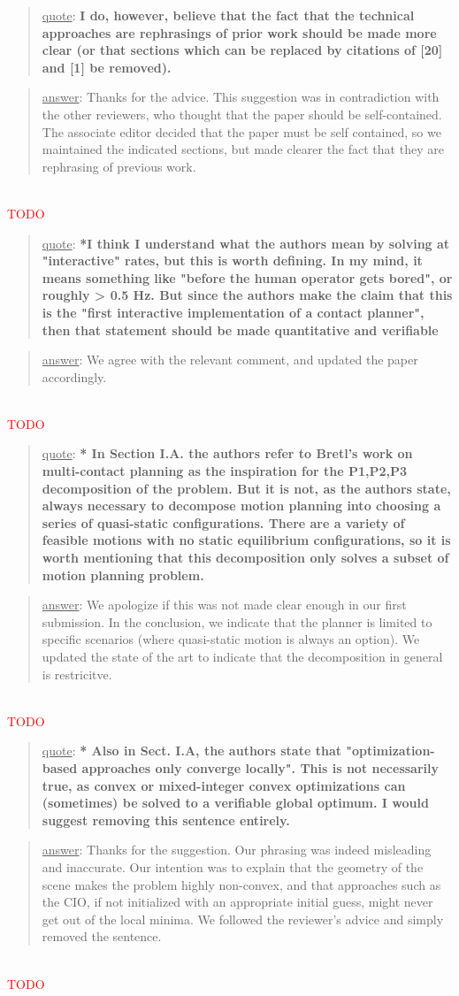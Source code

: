 \documentclass[a4paper]{article}
\newcommand{\ndone}[0]{\textcolor{red}{TODO}}
\newcommand\quot[1]{\begin{quote} \underline{quote}: \textbf{#1}\end{quote}}
\newcommand\as[1]{\begin{quote} \underline{answer}: {#1}\end{quote} \leavevmode \\ }
\begin{document}
\quot{I do, however,
believe that the fact that the technical approaches are rephrasings of
prior work should be made more clear (or that sections which can be
replaced by citations of [20] and [1] be removed).}
\as{Thanks for the advice. This suggestion was in contradiction with the other reviewers, who thought that the paper should be self-contained.
The associate editor decided that the paper must be self contained, so we maintained the indicated sections, but made clearer the fact that they are rephrasing of previous work. }\ndone

\quot{*I think I understand what the authors mean by solving at
"interactive" rates, but this is worth defining. In my mind, it means
something like "before the human operator gets bored", or roughly > 0.5
Hz. But since the authors make the claim that this is the "first
interactive implementation of a contact planner", then that statement
should be made quantitative and verifiable}
\as{We agree with the relevant comment, and updated the paper accordingly.}\ndone

\quot{* In Section I.A. the authors refer to Bretl's work on multi-contact
planning as the inspiration for the P1,P2,P3 decomposition of the
problem. But it is not, as the authors state, always necessary to
decompose motion planning into choosing a series of quasi-static
configurations. There are a variety of feasible motions with no static
equilibrium configurations, so it is worth mentioning that this
decomposition only solves a subset of motion planning problem.}
\as{We apologize if this was not made clear enough in our first submission. In the conclusion, we indicate that the planner is limited to specific scenarios (where quasi-static motion
is always an option). We updated the state of the art to indicate that the decomposition in general is restricitve.}\ndone

\quot{* Also in Sect. I.A, the authors state that "optimization-based
approaches only converge locally". This is not necessarily true, as
convex or mixed-integer convex optimizations can (sometimes) be solved
to a verifiable global optimum. I would suggest removing this sentence
entirely.}
\as{Thanks for the suggestion. Our phrasing was indeed misleading and inaccurate. Our intention was to explain that the geometry of the scene makes the problem highly non-convex, and
that approaches such as the CIO, if not initialized with an appropriate initial guess, might never get out of the local minima. We followed the reviewer's advice and simply removed the sentence. }\ndone
\end{document}
